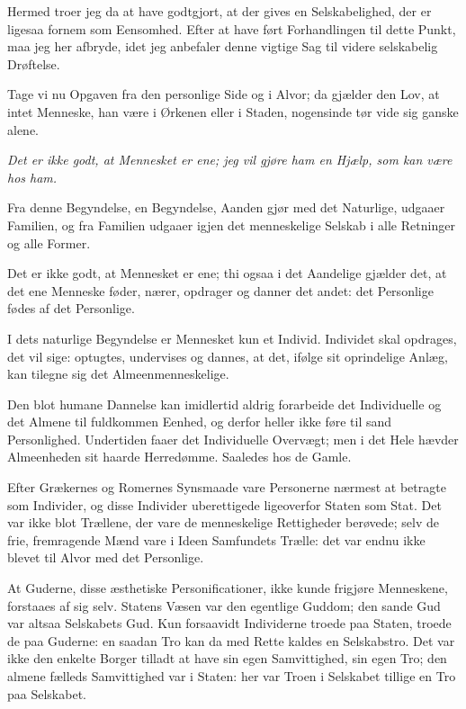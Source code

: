 \documentclass[12pt,a4paper]{book}
\newcommand{\apage}[1]{\marginnote{\footnotesize\textit{[#1]}}}
\begin{document}
Hermed troer jeg da at have godtgjort, at der gives en Selskabelighed, der er ligesaa fornem som Eensomhed. \apage{47} Efter
at have ført Forhandlingen til dette Punkt, maa jeg her afbryde, idet jeg anbefaler denne vigtige Sag til videre selskabelig Drøftelse.

Tage vi nu Opgaven fra den personlige Side og i Alvor; da gjælder den Lov, at intet Menneske, han være i Ørkenen eller i Staden, nogensinde tør vide sig ganske alene.

\emph{Det er ikke godt, at Mennesket er ene; jeg vil gjøre ham en Hjælp, som kan være hos ham.}

Fra denne Begyndelse, en Begyndelse, Aanden gjør med det Naturlige, udgaaer Familien, og fra Familien udgaaer igjen det menneskelige Selskab i alle Retninger og alle Former.

Det er ikke godt, at Mennesket er ene; thi ogsaa i det Aandelige gjælder det, at det ene Menneske føder, nærer, opdrager og danner det andet: det Personlige fødes af det Personlige.

I dets naturlige Begyndelse er Mennesket kun et Individ. Individet skal opdrages, det vil sige: optugtes, undervises og dannes, at det, ifølge sit oprindelige Anlæg, kan tilegne sig det Almeenmenneskelige.

Den blot humane Dannelse kan imidlertid aldrig forarbeide det Individuelle og det Almene til fuldkommen Eenhed, og derfor heller ikke føre til sand Personlighed. Undertiden faaer det Individuelle Overvægt; men i det Hele hævder Almeenheden sit haarde Herredømme. Saaledes hos de Gamle.

Efter Grækernes og Romernes Synsmaade vare Personerne nærmest at betragte som Individer, og disse Individer uberettigede ligeoverfor Staten som Stat. Det var ikke blot Trællene, der vare de menneskelige Rettigheder berøvede; selv de frie, fremragende Mænd vare i Ideen Samfundets Trælle: det var endnu ikke blevet til Alvor med det Personlige.

At Guderne, disse æsthetiske Personificationer, ikke kunde frigjøre Menneskene, forstaaes af sig selv. Statens Væsen var den egentlige Guddom; den sande Gud var altsaa Selskabets Gud. Kun forsaavidt Individerne troede paa Staten, troede de paa Guderne: en saadan Tro kan da med Rette \apage{48}
kaldes en Selskabstro. Det var ikke den enkelte Borger tilladt at have sin egen Samvittighed, sin egen Tro; den almene fælleds Samvittighed var i Staten: her var Troen i Selskabet tillige en Tro paa Selskabet.
\end{document}
